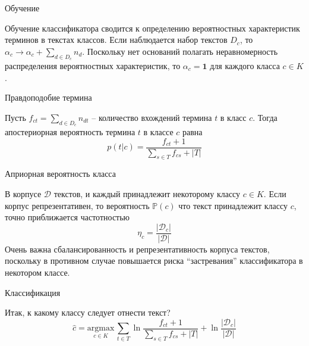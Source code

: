 \documentclass{beamer}
\newcommand{\brac}[1]{\left ( #1 \right )}
\newcommand{\induc}[1]{\left . #1 \right \vert}
\newcommand{\abs}[1]{\left | #1 \right |}
\newcommand{\Dcal}{\mathcal{D}}
\begin{document}
\begin{frame}
  \begin{block}{Обучение}

    Обучение классификатора сводится к определению вероятностных характеристик терминов в текстах классов.
    Если наблюдается набор текстов $D_c$, то $\alpha_c \to \alpha_c + \sum_{d\in D_c}n_d$.
    Поскольку нет оснований полагать неравномерность распределения вероятностных характеристик, то $\alpha_c = \mathbf{1}$ для каждого класса $c\in K$.
  \end{block}
  \begin{block}{Правдоподобие термина}

    Пусть $f_{ct} = \sum_{d\in D_c} n_{dt}$ -- количество вхождений термина $t$ в класс $c$.
    Тогда апостериорная вероятность термина $t$ в классе $c$ равна
    \[p\brac{\induc{t}c} = \frac{ f_{ct} + 1}{ \sum_{s\in T}f_{cs} + \abs{T}}\]
  \end{block}
\end{frame}

\begin{frame}
  \begin{block}{Априорная вероятность класса}

    В корпусе $\Dcal$ текстов, и каждый принадлежит некоторому классу $c\in K$. Если корпус репрезентативен, то вероятность $\mathbb{P}(c)$ что текст принадлежит классу $c$, точно приближается частотностью
    \[\eta_c = \frac{\abs{\Dcal_c}}{\abs{\Dcal}}\]
    Очень важна сбалансированность и репрезентативность корпуса текстов, поскольку в противном случае повышается риска ``застревания'' классификатора в некотором классе.
  \end{block}
  \begin{block}{Классификация}

    Итак, к какому классу следует отнести текст?
    \[\hat{c} = \underset{c\in K}{\text{argmax}}\, \sum_{t\in T} \ln \frac{f_{ct} + 1}{\sum_{s\in T}f_{cs} + \abs{T}} + \ln\frac{\abs{\Dcal_c}}{\abs{\Dcal}}\]
  \end{block}
\end{frame}

\end{document}
